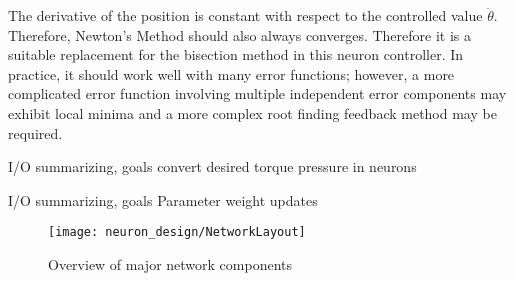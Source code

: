 The derivative of the position is constant with respect to the controlled value
$\ddot{\theta}$. Therefore, Newton's Method should also always converges.
Therefore it is a suitable replacement for the bisection method in this neuron
controller. In practice, it should work well with many error functions; however,
a more complicated error function involving multiple independent error 
components may exhibit local minima and a more complex root finding feedback
method may be required.


I/O summarizing, goals
convert desired torque pressure in neurons








I/O summarizing, goals
Parameter weight updates








\begin{figure}[h!]
\centering
\texttt{[image: neuron\_design/NetworkLayout]}
\caption{Overview of major network components}
\label{fig:NetworkLayout}
\end{figure}
